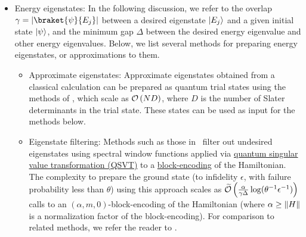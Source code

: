 \begin{refsection}
\begin{itemize}
    \item Energy eigenstates:
    In the following discussion, we refer to the overlap $\gamma = |\braket{\psi}{E_j}|$ between a desired eigenstate $\lvert E_j\rangle$ and a given initial state $\lvert\psi\rangle$, and the minimum gap $\Delta$ between the desired energy eigenvalue and other energy eigenvalues. Below, we list several methods for preparing energy eigenstates, or approximations to them.
    \begin{itemize}
        \item Approximate eigenstates: Approximate eigenstates obtained from a classical calculation can be prepared as quantum trial states using the methods of \cite{tubman2018PostponingCatastrophe,sugisaki2019MulticonfigurationalChemistryPrep}, which scale as $\mathcal{O}\left( ND \right)$, where $D$ is the number of Slater determinants in the trial state. These states can be used as input for the methods below.
        \item Eigenstate filtering: Methods such as those in~\cite{lin2019OptimalQEigenstateFiltering,lin2020NearOptimalGroundState} filter out undesired eigenstates using spectral window functions applied via \hyperref[prim:QSVT]{quantum singular value transformation (QSVT)} to a \hyperref[prim:BlockEncodings]{block-encoding} of the Hamiltonian. The complexity to prepare the ground state (to infidelity $\epsilon$, with failure probability less than $\theta$) using this approach scales as $\widetilde{\mathcal{O}}\left(  \frac{\alpha}{\gamma \Delta} \log(\theta^{-1} \epsilon^{-1})  \right) $ calls to an $(\alpha, m, 0)$-block-encoding of the Hamiltonian (where $\alpha \geq \lVert H\rVert$ is a normalization factor of the block-encoding). For comparison to related methods, we refer the reader to \cite{ge2017FasterGroundStatePrep,lin2020NearOptimalGroundState}.

\end{itemize}
\end{itemize}
\end{refsection}

